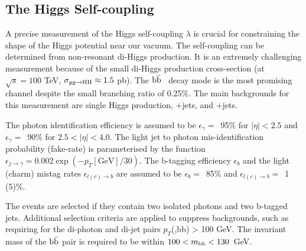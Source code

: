 \documentclass[11pt,twoside,a4paper]{cernrep}
\newcommand*{\effg}{\ensuremath{\epsilon_{\gamma}}}
\newcommand*{\misg}{\ensuremath{\epsilon_{j \rightarrow \gamma}}}
\newcommand*{\effb}{\ensuremath{\epsilon_{b}}}
\newcommand*{\mislc}{\ensuremath{\epsilon_{l(c) \rightarrow b}}}
\begin{document}
\subsection{The Higgs Self-coupling}

A precise measurement of the Higgs self-coupling $\lambda$ is crucial for constraining the shape of the Higgs potential near our vacuum. The self-coupling can be determined from non-resonant di-Higgs production. It is an extremely challenging measurement because of the small di-Higgs production cross-section (at $\sqrt{s} {=}100$ TeV, $\sigma_{gg\to {\rm HH}} \approx 1.5$ pb). The $\rm b\bar{b}$\textgamma\textgamma~ decay mode is the most promising channel despite the small branching ratio of 0.25\%. The main backgrounds for this measurement are single Higgs production, \textgamma\textgamma+jets, and \textgamma+jets.

The photon identification efficiency is assumed to be $\effg=$~95\% for $|\eta| < 2.5$ and $\effg=$~90\% for $2.5 < |\eta| < 4.0$. The light jet to photon mis-identification probability (fake-rate) is parameterised by the function $\misg = 0.002 \exp(-p_T[\mathrm{GeV}]/30)$. The b-tagging efficiency $\effb$ and the light (charm) mistag rates $\mislc$ are assumed to be $\effb=$~85\% and $\mislc=$~1 (5)\%.

The events are selected if they contain two isolated photons and two b-tagged jets. Additional selection criteria are applied to suppress backgrounds, such as requiring for the di-photon and di-jet pairs $p_T$(\textgamma\textgamma,bb) > 100 GeV. The invariant mass of the $\rm b\bar{b}$ pair is required to be within \linebreak \mbox{$100 <m_{\rm bb} < 130$ GeV}.
\end{document}
